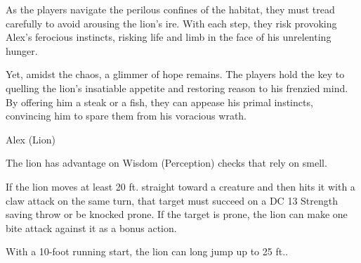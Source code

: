 As the players navigate the perilous confines of the habitat, they must tread carefully to avoid arousing the lion's ire. With each step, they risk provoking Alex's ferocious instincts, risking life and limb in the face of his unrelenting hunger.

Yet, amidst the chaos, a glimmer of hope remains. The players hold the key to quelling the lion's insatiable appetite and restoring reason to his frenzied mind. By offering him a steak or a fish, they can appease his primal instincts, convincing him to spare them from his voracious wrath.
\begin{DndMonster}[width=0.5\textwidth]{Alex (Lion)}

	\DndMonsterBasics[
		armor-class = {15 (Natural Armor)},
		hit-points  = {\DndDice{8d10 + 8}},
		speed       = {50 ft.},
	]

	\renewcommand{\AbilityScoreSpacer}{~}

	\DndMonsterAbilityScores[
		str = 17,
		dex = 15,
		con = 13,
		int = 3,
		wis = 12,
		cha = 8,
	]

	\DndMonsterDetails[
		skills = {Perception +3, Stealth +6},
		senses = {passive Perception 13},
		languages = {Common},
		challenge = 3,
	]

	The lion has advantage on Wisdom (Perception) checks that rely on smell.
	
	If the lion moves at least 20 ft. straight toward a creature and then hits it with a claw attack on the same turn, that target must succeed on a DC 13 Strength saving throw or be knocked prone. If the target is prone, the lion can make one bite attack against it as a bonus action.
	
	With a 10-foot running start, the lion can long jump up to 25 ft..
	

	\DndMonsterAttack[
		name=Bite,
		distance=melee, %
		mod=+5,
		reach=5,
		targets=one target,
		dmg={\DndDice{1d8 + 3}},
		dmg-type=piercing,
	]
	
	\DndMonsterAttack[
		name=Claw,
		distance=melee, %
		mod=+8,
		reach=5,
		targets=one target,
		dmg={\DndDice{1d6 + 3}},
		dmg-type=slashing,
	]
\end{DndMonster}
